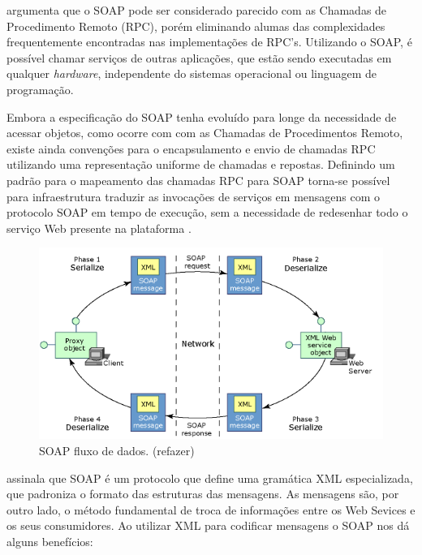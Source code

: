  argumenta que o SOAP pode ser considerado parecido com as Chamadas de Procedimento Remoto (RPC), porém eliminando alumas das complexidades frequentemente encontradas nas implementações de RPC's. Utilizando o SOAP, é possível chamar serviços de outras aplicações, que estão sendo executadas em qualquer \textit{hardware}, independente do sistemas operacional ou linguagem de programação.

Embora a especificação do SOAP tenha evoluído para longe da necessidade de acessar objetos, como ocorre com com as Chamadas de Procedimentos Remoto, existe ainda convenções para o encapsulamento e envio de chamadas RPC utilizando uma representação uniforme de chamadas e repostas. Definindo um padrão para o mapeamento das chamadas RPC para SOAP torna-se possível para infraestrutura traduzir as invocações de serviços em mensagens com o protocolo SOAP em tempo de execução, sem a necessidade de redesenhar todo o serviço Web presente na plataforma \cite{soap-microsoft}.

\begin{figure}[htbp]
\centering
\includegraphics[width=1\textwidth]{figuras/soap-st.png}
\caption{SOAP fluxo de dados. (refazer)}
\label{fig:soap}
\author{https://msdn.microsoft.com/en-us/library/x05s00wz(v=vs.80).aspx}
\end{figure}

\pagebreak


 assinala que SOAP é um protocolo que define uma gramática XML especializada, que padroniza o formato das estruturas das mensagens. As mensagens são, por outro lado, o método fundamental de troca de informações entre os Web Sevices e os seus consumidores. Ao utilizar XML para codificar mensagens o SOAP nos dá alguns benefícios:

